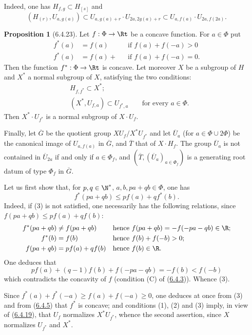 \documentclass[12pt,a4paper,oneside,english]{smfart}
\makeatletter
\newcommand{\btanchor}[1]{\leavevmode\Hy@raisedlink{\hypertarget{bt:#1}{}}}
\newcommand{\btref}[1]{\hyperlink{bt:#1}{#1}}
\theoremstyle{definition}
\theoremstyle{bt}
\newtheorem{prop}{Proposition}
\makeatother
\begin{document}
Indeed, one has $H_{f,g}\subset H_{[s]}$ and
\[
  (H_{(r)},U_{a,g(a)})\subset U_{a,g(a)+r}\cdot U_{2a,2g(a)+r}
   \subset U_{a,f(a)}\cdot U_{2a,f(2a)}.
\]

\begin{prop}[6.4.23]\btanchor{6.4.23}
Let $f:\Phi\to\Rt$ be a concave function. For $a\in\Phi$ put
\begin{align*}
  f^{*}(a)&=f(a)   &&\text{if } f(a)+f(-a)>0\\
  f^{*}(a)&=f(a)+  &&\text{if } f(a)+f(-a)=0 .
\end{align*}
Then the function $f^{*}:\Phi\to\Rt$ is concave. Let moreover $X$ be a
subgroup of $H$ and $X^{*}$ a normal subgroup of $X$, satisfying the two
conditions:
\begin{align}
  &H_{f,f^{*}}\subset X^{*};\\
  &(X^{*},U_{f,a})\subset U_{f^{*},a}\qquad\text{for every }a\in\Phi.
\end{align}
Then $X^{*}\cdot U_{f^{*}}$ is a normal subgroup of $X\cdot U_f$.

Finally, let $\overline{G}$ be the quotient group $XU_f/X^{*}U_{f^{*}}$ and
let $\overline{U}_a$ (for $a\in\Phi\cup2\Phi$) be the canonical image of
$U_{a,f(a)}$ in $\overline{G}$, and $\overline{T}$ that of $X\cdot H_f$.
The group $\overline{U}_a$ is not contained in $\overline{U}_{2a}$ if and
only if $a\in\Phi_f$, and
$(\overline{T},(\overline{U}_a)_{a\in\Phi_f})$ is a generating root datum of
type $\Phi_f$ in $\overline{G}$.
\end{prop}

Let us first show that, for $p,q\in\N^{*}$, $a,b,pa+qb\in\Phi$, one has
\begin{equation}
  f^{*}(pa+qb)\leq pf(a)+qf^{*}(b).
\end{equation}
Indeed, if (3) is not satisfied, one necessarily has the following
relations, since $f(pa+qb)\leq pf(a)+qf(b)$:
\begin{align*}
  f^{*}(pa+qb)&\neq f(pa+qb) &&\text{hence } f(pa+qb)=-f(-pa-qb)\in\R;\\
  f^{*}(b)&=f(b) &&\text{hence } f(b)+f(-b)>0;\\
  f(pa+qb)&=pf(a)+qf(b) &&\text{hence } f(b)\in\R.
\end{align*}
One deduces that
\[
  pf(a)+(q-1)f(b)+f(-pa-qb)=-f(b)<f(-b)
\]
which contradicts the concavity of $f$ (condition (C) of (\btref{6.4.3})). Whence
(3).

Since $f^{*}(a)+f^{*}(-a)\geq f(a)+f(-a)\geq0$, one deduces at once from
(3) and from (\btref{6.4.5}) that $f^{*}$ is concave; and conditions (1), (2) and
(3) imply, in view of (\btref{6.4.19}), that $U_f$ normalizes $X^{*}U_{f^{*}}$,
whence the second assertion, since $X$ normalizes $U_{f^{*}}$ and $X^{*}$.
\end{document}
